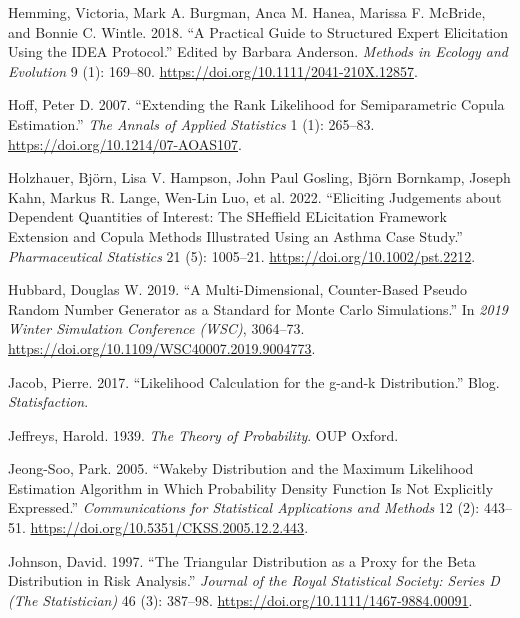 \documentclass[
]{interact}
\newlength{\cslhangindent}
\newenvironment{CSLReferences}[2] %
 {\begin{list}{}{%
  \setlength{\itemindent}{0pt}
  \setlength{\leftmargin}{0pt}
  \setlength{\parsep}{0pt}
  \ifodd #1
   \setlength{\leftmargin}{\cslhangindent}
   \setlength{\itemindent}{-1\cslhangindent}
  \fi
  \setlength{\itemsep}{#2\baselineskip}}}
 {\end{list}}
\begin{document}
\begin{CSLReferences}{1}{0}
Hemming, Victoria, Mark A. Burgman, Anca M. Hanea, Marissa F. McBride,
and Bonnie C. Wintle. 2018. {``A Practical Guide to Structured Expert
Elicitation Using the {IDEA} Protocol.''} Edited by Barbara Anderson.
\emph{Methods in Ecology and Evolution} 9 (1): 169--80.
\url{https://doi.org/10.1111/2041-210X.12857}.

Hoff, Peter D. 2007. {``Extending the Rank Likelihood for Semiparametric
Copula Estimation.''} \emph{The Annals of Applied Statistics} 1 (1):
265--83. \url{https://doi.org/10.1214/07-AOAS107}.

Holzhauer, Björn, Lisa V. Hampson, John Paul Gosling, Björn Bornkamp,
Joseph Kahn, Markus R. Lange, Wen-Lin Luo, et al. 2022. {``Eliciting
Judgements about Dependent Quantities of Interest: {The SHeffield
ELicitation Framework} Extension and Copula Methods Illustrated Using an
Asthma Case Study.''} \emph{Pharmaceutical Statistics} 21 (5): 1005--21.
\url{https://doi.org/10.1002/pst.2212}.

Hubbard, Douglas W. 2019. {``A {Multi-Dimensional}, {Counter-Based
Pseudo Random Number Generator} as a {Standard} for {Monte Carlo
Simulations}.''} In \emph{2019 {Winter Simulation Conference} ({WSC})},
3064--73. \url{https://doi.org/10.1109/WSC40007.2019.9004773}.

Jacob, Pierre. 2017. {``Likelihood Calculation for the g-and-k
Distribution.''} Blog. \emph{Statisfaction}.

Jeffreys, Harold. 1939. \emph{The Theory of Probability}. OUP Oxford.

Jeong-Soo, Park. 2005. {``{Wakeby Distribution and the Maximum
Likelihood Estimation Algorithm in Which Probability Density Function Is
Not Explicitly Expressed}.''} \emph{Communications for Statistical
Applications and Methods} 12 (2): 443--51.
\url{https://doi.org/10.5351/CKSS.2005.12.2.443}.

Johnson, David. 1997. {``The Triangular Distribution as a Proxy for the
Beta Distribution in Risk Analysis.''} \emph{Journal of the Royal
Statistical Society: Series D (The Statistician)} 46 (3): 387--98.
\url{https://doi.org/10.1111/1467-9884.00091}.


\end{CSLReferences}
\end{document}
